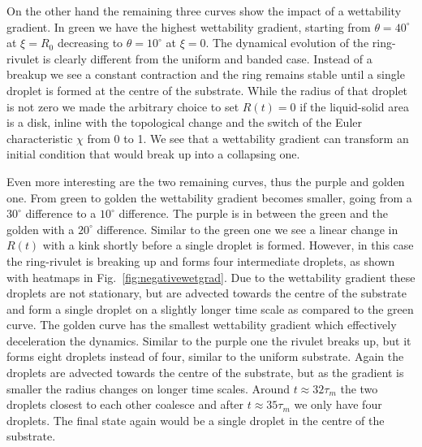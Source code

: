 \documentclass[twoside,twocolumn,9pt]{article}
\begin{document}
On the other hand the remaining three curves show the impact of a wettability gradient.  
In green we have the highest wettability gradient, starting from $\theta = 40^{\circ}$ at $\xi = R_0$ decreasing to $\theta = 10^{\circ}$ at $\xi = 0$. 
The dynamical evolution of the ring-rivulet is clearly different from the uniform and banded case.
Instead of a breakup we see a constant contraction and the ring remains stable until a single droplet is formed at the centre of the substrate.
While the radius of that droplet is not zero we made the arbitrary choice to set $R(t) = 0$ if the liquid-solid area is a disk, inline with the topological change and the switch of the Euler characteristic $\chi$ from 0 to 1.
We see that a wettability gradient can transform an initial condition that would break up into a collapsing one.

Even more interesting are the two remaining curves, thus the purple and golden one.
From green to golden the wettability gradient becomes smaller, going from a $30^{\circ}$ difference to a $10^{\circ}$ difference.
The purple is in between the green and the golden with a $20^{\circ}$ difference. 
Similar to the green one we see a linear change in $R(t)$ with a kink shortly before a single droplet is formed.
However, in this case the ring-rivulet is breaking up and forms four intermediate droplets, as shown with heatmaps in Fig.~\ref{fig:negativewetgrad}.
Due to the wettability gradient these droplets are not stationary, but are advected towards the centre of the substrate and form a single droplet on a slightly longer time scale as compared to the green curve.
The golden curve has the smallest wettability gradient which effectively deceleration the dynamics.
Similar to the purple one the rivulet breaks up, but it forms eight droplets instead of four, similar to the uniform substrate.
Again the droplets are advected towards the centre of the substrate, but as the gradient is smaller the radius changes on longer time scales. 
Around $t\approx 32\tau_m$ the two droplets closest to each other coalesce and after $t\approx 35\tau_m$ we only have four droplets.
The final state again would be a single droplet in the centre of the substrate.
\end{document}
